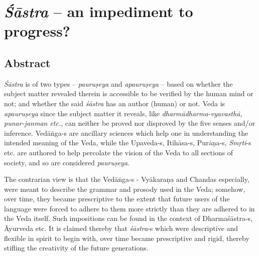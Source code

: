 \chapter{{{\sl\bfseries Śāstra}\relax} -- an impediment to progress?}\label{chapter\thechapter:begin}
\vskip -10pt


\vskip -10pt


\section*{Abstract}

{\sl Śāstra} is of two types -- {\sl pauruṣeya} and {\sl apauruṣeya} --   based on whether the subject matter revealed therein is accessible to be veriﬁed by the human mind or not; and whether the said {\sl śāstra} has an author (human) or not. Veda is {\sl apauruṣeya} since the subject matter it reveals, like {\sl dharmādharma-vyavasthā, punar-janman etc.}, can neither be proved nor disproved by the ﬁve senses and/or inference. Vedāṅga-s are ancillary sciences which help one in understanding the intended meaning of the Veda, while the Upaveda-s, Itihāsa-s, Purāṇa-s, {\sl Smṛti}-s etc. are authored to help percolate the vision of the Veda to all sections of society, and so are considered {\sl pauruṣeya}.

The contrarian view is that the Vedāṅga-s - Vyākaraṇa and Chandas especially, were meant to describe the grammar and prosody used in the Veda; somehow, over time, they became prescriptive to the extent that future users of the language were forced to adhere to them more strictly than they are adhered to in the Veda itself. Such impositions can be found in the context of Dharmaśāstra-s, Āyurveda etc. It is claimed thereby that {\sl śāstra}-s which were descriptive and ﬂexible in spirit to begin with, over time became prescriptive and rigid, thereby stiﬂing the creativity of the future generations.

